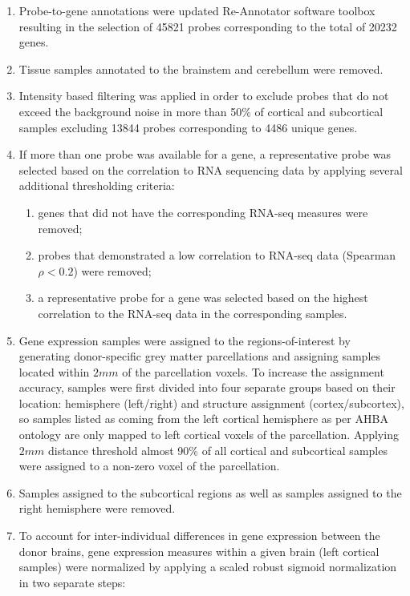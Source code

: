 \begin{enumerate}\addtocounter{enumii}{5}%
      \item Probe-to-gene annotations were updated Re-Annotator software toolbox \citep{Arloth2015} resulting in the selection of \num{45821} probes corresponding to the total of \num{20232} genes.
      \item Tissue samples annotated to the brainstem and cerebellum were removed.
      \item Intensity based filtering was applied in order to exclude probes that do not exceed the background noise in more than 50\% of cortical and subcortical samples excluding \num{13844} probes corresponding to \num{4486} unique genes.
      \item If more than one probe was available for a gene, a representative probe was selected based on the correlation to RNA sequencing data \citep{Miller2014a} by applying several additional thresholding criteria:
      \begin{enumerate}
      \item genes that did not have the corresponding RNA-seq measures were removed;
      \item probes that demonstrated a low correlation to RNA-seq data (Spearman $\rho<0.2$) were removed;
	  \item a representative probe for a gene was selected based on the highest correlation to the RNA-seq data in the corresponding samples.
      \end{enumerate}
      \item Gene expression samples were assigned to the regions-of-interest by generating donor-specific grey matter parcellations and assigning samples located within $2mm$ of the parcellation voxels. To increase the assignment accuracy, samples were first divided into four separate groups based on their location: hemisphere (left/right) and structure assignment (cortex/subcortex), so samples listed as coming from the left cortical hemisphere as per AHBA ontology are only mapped to left cortical voxels of the parcellation. Applying $2mm$ distance threshold almost 90\% of all cortical and subcortical samples were assigned to a non-zero voxel of the parcellation.
      \item Samples assigned to the subcortical regions as well as samples assigned to the right hemisphere were removed.
      \item To account for inter-individual differences in gene expression between the donor brains, gene expression measures within a given brain (left cortical samples) were normalized by applying a scaled robust sigmoid normalization \citep{Arnatkeviciute2019} in two separate steps:

\end{enumerate}
